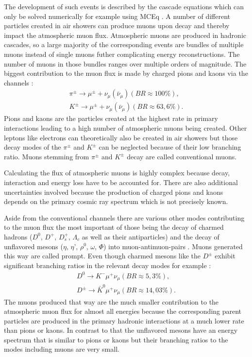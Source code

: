 \documentclass[
  tucolor,       %
  BCOR=12mm,     %
  parskip=half,  %
  open=any,      %
  cleardoublepage=plain,  %
]{tudothesis}
\begin{document}
The development of such events is described by the cascade equations which can only be solved numerically for example using MCEq \cite{gaisser2019precision}.
A number of different particles created in air showers can produce muons upon decay and thereby impact the atmospheric muon flux. 
Atmospheric muons are produced in hadronic cascades, so a large majority of the corresponding events are bundles of multiple muons instead of single muons futher complicating energy reconstructions. The number of muons in those bundles ranges over multiple orders of magnitude.
The biggest contribution to the muon flux is made by charged pions and kaons via the channels \cite{gaisser_engel_resconi_2016}:
\begin{align}
  \pi^{\pm} \rightarrow \mu^{\pm}+\nu_{\mu}(\bar{\nu}_{\mu}) (BR\approx100\%), \\
  K^{\pm} \rightarrow \mu^{\pm}+\nu_{\mu}(\bar{\nu}_{\mu}) (BR\approx63,6\%). 
\end{align}
Pions and kaons are the particles created at the highest rate in primary interactions leading to a high number of atmospheric muons being created. Other leptons like electrons can theoretically also be created in air showers but those decay modes of the $\pi^{\pm}$ and $K^{\pm}$ can be neglected because of their low branching ratio.
Muons stemming from $\pi^{\pm}$ and $K^{\pm}$ decay are called conventional muons. 

Calculating the flux of atmospheric muons is highly complex because decay, interaction and energy loss have to be accounted for.
There are also additional uncertainties involved because the production of charged pions and kaons depends on the primary cosmic ray spectrum which is not precisely known.

Aside from the conventional channels there are various other modes contributing to the muon flux the most important of those being the decay of charmed hadrons ($D^0$, $D^+$, $D_s^+$, $\Lambda_c$ as well as their antiparticles) and the decay of unflavored mesons ($\eta$, $\eta$', $\rho^0$, $\omega$, $\Phi$) into muon-antimuon-pairs \cite{Illana_2011}. Muons generated this way are called prompt.
Even though charmed mesons like the $D^{\pm}$ exhibit significant branching ratios in the relevant decay modes for example \cite{pdg}:
\begin{align}
  D^0 \rightarrow K^-\mu^+\nu_{\mu}(BR\approx5,3\%), \\
  D^{\pm} \rightarrow \bar{K}^0\mu^+\nu_{\mu}(BR\approx14,03\%).
\end{align}
The muons produced that way are the much smaller contribution to the atmospheric muon flux for almost all energies because the corresponding parent particles are produced in the primary hadronic interactions at a much lower rate than pions or kaons. 
In contrast to that the unflavored mesons have an energy spectrum that is similar to pions or kaons but their branching ratios to the modes including muons are very small.
\end{document}
